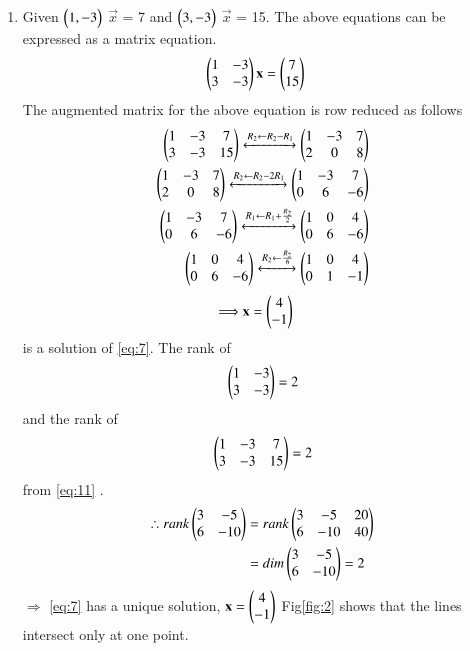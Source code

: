 \documentclass[journal,12pt,twocolumn]{IEEEtran}
\begin{document}
\begin{enumerate}
    \item Given $\begin{pmatrix}1,-3\end{pmatrix}$ $\vec{x}$ = 7 and $\begin{pmatrix}3,-3\end{pmatrix}$ $\vec{x}$ = 15.
    The above equations can be expressed as a matrix equation.
    \begin{align}
\label{eq:7}
  \begin{pmatrix}1&-3\\3&-3\end{pmatrix}\mathbf{x} &= \begin{pmatrix}7\\15\end{pmatrix}
\end{align}
The augmented matrix for the above equation
is row reduced as follows
\begin{align}
    \begin{pmatrix}1&-3&7\\3&-3&15\end{pmatrix}\xleftrightarrow{R_2\leftarrow R_2 -R_1}\begin{pmatrix}1&-3&7\\2&0&8\end{pmatrix} 
    \\ 
    \begin{pmatrix}1&-3&7\\2&0&8\end{pmatrix}\xleftrightarrow{R_2\leftarrow R_2 -2R_1}\begin{pmatrix}1&-3&7\\0&6&-6\end{pmatrix} 
    \\
    \begin{pmatrix}1&-3&7\\0&6&-6\end{pmatrix}\xleftrightarrow{R_1\leftarrow R_1 +\frac{R_2}{2}}\begin{pmatrix}1&0&4\\0&6&-6\end{pmatrix} 
\\ \begin{pmatrix}1&0&4\\0&6&-6\end{pmatrix}\xleftrightarrow{R_2\leftarrow\frac{R_2}{6}}\begin{pmatrix}1&0&4\\0&1&-1\end{pmatrix} \label{eq:11}\end{align} 
\begin{align}
 \Longrightarrow \mathbf{x}&=\begin{pmatrix}4\\-1\end{pmatrix}
\end{align} is a solution of \ref{eq:7}.
The rank of
\begin{equation} 
\begin{pmatrix}1&-3\\3&-3\end{pmatrix} = 2
\end{equation}
and the rank of
\begin{equation} 
\begin{pmatrix}1&-3&7\\3&-3&15\end{pmatrix} = 2
\end{equation}from \ref{eq:11} .
\begin{align}
    \therefore rank \begin{pmatrix}3&-5\\6&-10\end{pmatrix} &= rank\begin{pmatrix}3&-5&20\\6&-10&40\end{pmatrix}\\
    &=dim\begin{pmatrix}3&-5\\6&-10\end{pmatrix}=2
\end{align}
$\Longrightarrow$ \ref{eq:7} has a unique solution, $\mathbf{x}=\begin{pmatrix}4\\-1\end{pmatrix}$
Fig\ref{fig:2} shows that the lines intersect only at one point.


\end{enumerate}
\end{document}
